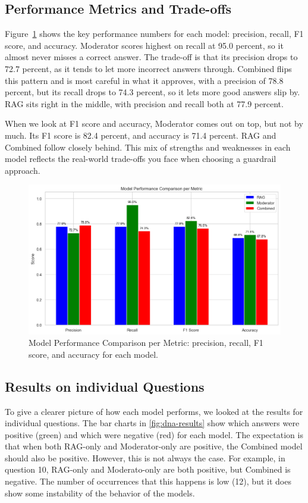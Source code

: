 \subsection{Performance Metrics and Trade-offs}

Figure~\ref{fig:model_performance_comparison_per_metric} shows the key performance numbers for each model: precision, recall, F1 score, and accuracy. Moderator scores highest on recall at 95.0 percent, so it almost never misses a correct answer. The trade-off is that its precision drops to 72.7 percent, as it tends to let more incorrect answers through. Combined flips this pattern and is most careful in what it approves, with a precision of 78.8 percent, but its recall drops to 74.3 percent, so it lets more good answers slip by. RAG sits right in the middle, with precision and recall both at 77.9 percent.

When we look at F1 score and accuracy, Moderator comes out on top, but not by much. Its F1 score is 82.4 percent, and accuracy is 71.4 percent. RAG and Combined follow closely behind. This mix of strengths and weaknesses in each model reflects the real-world trade-offs you face when choosing a guardrail approach.

\begin{figure}[ht]
  \centering
  \includegraphics[width=0.95\linewidth]{figures/model_performance comparison_per_metric.png}
  \caption{Model Performance Comparison per Metric: precision, recall, F1 score, and accuracy for each model.}
  \label{fig:model_performance_comparison_per_metric}
\end{figure}

\subsection{Results on individual Questions}
To give a clearer picture of how each model performs, we looked at the results for individual questions.
The bar charts in \autoref{fig:dna-results} show which answers were positive (green) and which were negative (red) for each model.
The expectation is that when both RAG-only and Moderator-only are positive, the Combined model should also be positive.
However, this is not always the case. For example, in question 10, RAG-only and Moderato-only are both positive, but Combined is negative.
The number of occurrences that this happens is low (12), but it does show some instability of the behavior of the models.

